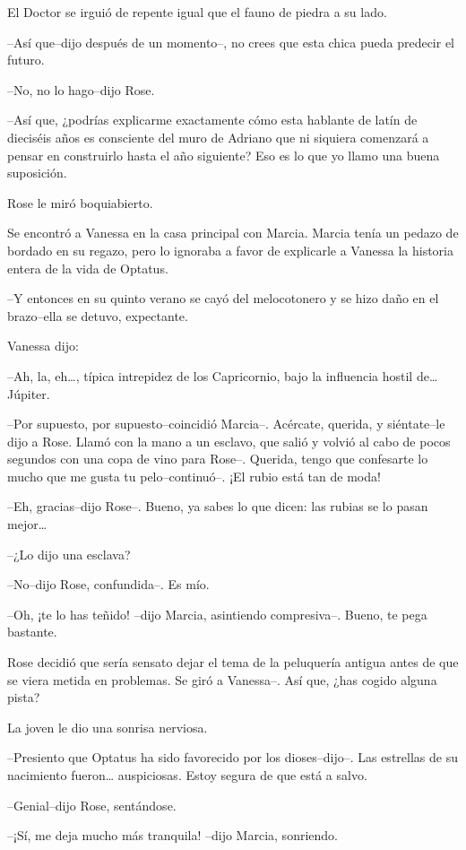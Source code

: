 El Doctor se irguió de repente igual que el fauno de piedra a su lado.

--Así que--dijo después de un momento--, no crees que esta chica pueda
predecir el futuro.

--No, no lo hago--dijo Rose.

--Así que, ¿podrías explicarme exactamente cómo esta hablante de latín
de dieciséis años es consciente del muro de Adriano que ni siquiera
comenzará a pensar en construirlo hasta el año siguiente? Eso es lo que
yo llamo una buena suposición.

Rose le miró boquiabierto.

Se encontró a Vanessa en la casa principal con Marcia. Marcia tenía un
pedazo de bordado en su regazo, pero lo ignoraba a favor de explicarle a
Vanessa la historia entera de la vida de Optatus.

--Y entonces en su quinto verano se cayó del melocotonero y se hizo daño
en el brazo--ella se detuvo, expectante.

Vanessa dijo:

--Ah, la, eh\ldots{}, típica intrepidez de los Capricornio, bajo la
influencia hostil de\ldots{} Júpiter.

--Por supuesto, por supuesto--coincidió Marcia--. Acércate, querida, y
siéntate--le dijo a Rose. Llamó con la mano a un esclavo, que salió y
volvió al cabo de pocos segundos con una copa de vino para Rose--.
Querida, tengo que confesarte lo mucho que me gusta tu pelo--continuó--.
¡El rubio está tan de moda!

--Eh, gracias--dijo Rose--. Bueno, ya sabes lo que dicen: las rubias se
lo pasan mejor\ldots{}

--¿Lo dijo una esclava?

--No--dijo Rose, confundida--. Es mío.

--Oh, ¡te lo has teñido! --dijo Marcia, asintiendo compresiva--. Bueno,
te pega bastante.

Rose decidió que sería sensato dejar el tema de la peluquería antigua
antes de que se viera metida en problemas. Se giró a Vanessa--. Así que,
¿has cogido alguna pista?

La joven le dio una sonrisa nerviosa.

--Presiento que Optatus ha sido favorecido por los dioses--dijo--. Las
estrellas de su nacimiento fueron\ldots{} auspiciosas. Estoy segura de
que está a salvo.

--Genial--dijo Rose, sentándose.

--¡Sí, me deja mucho más tranquila! --dijo Marcia, sonriendo.

